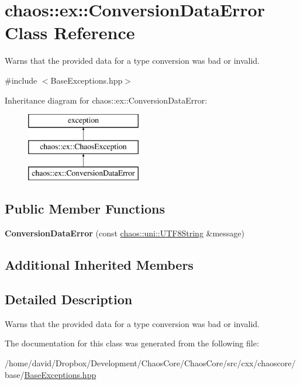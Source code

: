 \hypertarget{classchaos_1_1ex_1_1_conversion_data_error}{\section{chaos\-:\-:ex\-:\-:Conversion\-Data\-Error Class Reference}
\label{classchaos_1_1ex_1_1_conversion_data_error}
}


Warns that the provided data for a type conversion was bad or invalid.  




{\ttfamily \#include $<$Base\-Exceptions.\-hpp$>$}

Inheritance diagram for chaos\-:\-:ex\-:\-:Conversion\-Data\-Error\-:\begin{figure}[H]
\begin{center}
\leavevmode
\includegraphics[height=3.000000cm]{classchaos_1_1ex_1_1_conversion_data_error}
\end{center}
\end{figure}
\subsection*{Public Member Functions}
\begin{DoxyCompactItemize}
\item 
\hypertarget{classchaos_1_1ex_1_1_conversion_data_error_aed2ab811adb6562477bf2997354f87a9}{{\bfseries Conversion\-Data\-Error} (const \hyperlink{classchaos_1_1uni_1_1_u_t_f8_string}{chaos\-::uni\-::\-U\-T\-F8\-String} \&message)}\label{classchaos_1_1ex_1_1_conversion_data_error_aed2ab811adb6562477bf2997354f87a9}

\end{DoxyCompactItemize}
\subsection*{Additional Inherited Members}


\subsection{Detailed Description}
Warns that the provided data for a type conversion was bad or invalid. 

The documentation for this class was generated from the following file\-:\begin{DoxyCompactItemize}
\item 
/home/david/\-Dropbox/\-Development/\-Chaos\-Core/\-Chaos\-Core/src/cxx/chaoscore/base/\hyperlink{_base_exceptions_8hpp}{Base\-Exceptions.\-hpp}\end{DoxyCompactItemize}
